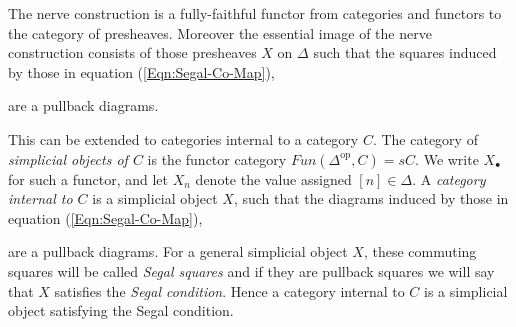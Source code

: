\documentclass{amsart}
\begin{document}
The nerve construction is a fully-faithful functor from categories and functors to the category of presheaves. Moreover the essential image of the nerve construction consists of those presheaves $X$ on $\Delta$  such that the squares induced by those in equation (\ref{Eqn:Segal-Co-Map}),
\begin{center}
\end{center} 
are a pullback diagrams. 

This can be extended to categories internal to a category $C$. 
The category of {\em simplicial objects of $C$} is the functor category $Fun(\Delta^\textrm{op}, C) = sC$. We write $X_\bullet$ for such a functor, and let $X_n$ denote the value assigned $[n] \in \Delta$. A {\em category internal to $C$} is a simplicial object $X$, such that the diagrams induced by those in equation (\ref{Eqn:Segal-Co-Map}),
\begin{center}
\end{center}
are a pullback diagrams. For a general simplicial object $X$, these commuting squares will be called {\em Segal squares} and if they are pullback squares we will say that $X$ satisfies the {\em Segal condition}. Hence a category internal to $C$ is a simplicial object satisfying the Segal condition. 
\end{document}
